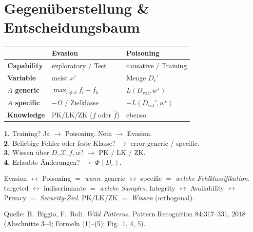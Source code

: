 \documentclass[10pt,a4paper]{article}
\begin{document}
\section{Gegen\"uberstellung \& Entscheidungsbaum}
\begin{tabularx}{\textwidth}{@{}>{\small\bfseries}l >{\small}X >{\small}X@{}}
\toprule
 & Evasion & Poisoning \\
\midrule
Capability & exploratory / Test & causative / Training \\
Variable & meist $x'$ & Menge $D_c'$ \\
$A$ generic & $\max_{l\neq k}f_l-f_k$ & $L(D_{\mathrm{val}},w^\star)$ \\
$A$ specific & $-\Omega$ / Zielklasse & $-L(D_{\mathrm{val}}',w^\star)$ \\
Knowledge & PK/LK/ZK ($f$ oder $\hat f$) & ebenso \\
\bottomrule
\end{tabularx}

\begin{tcolorbox}[tip, title=4 Fragen $\Rightarrow$ Angriff einordnen]
\textbf{1.} Training? Ja $\to$ Poisoning. Nein $\to$ Evasion.\\
\textbf{2.} Beliebige Fehler oder feste Klasse? $\to$ error-generic / specific.\\
\textbf{3.} Wissen \"uber $D,\mathcal{X},f,w$? $\to$ PK / LK / ZK.\\
\textbf{4.} Erlaubte \"Anderungen? $\to$ $\Phi(D_c)$.
\end{tcolorbox}

\begin{tcolorbox}[tip, title=Begriffspaare --- nicht vermischen]
Evasion $\leftrightarrow$ Poisoning $=$ \emph{wann}.\quad
generic $\leftrightarrow$ specific $=$ \emph{welche Fehlklassifikation}.\quad
targeted $\leftrightarrow$ indiscriminate $=$ \emph{welche Samples}.\quad
Integrity $\leftrightarrow$ Availability $\leftrightarrow$ Privacy $=$ \emph{Security-Ziel}.\quad
PK/LK/ZK $=$ \emph{Wissen} (orthogonal).
\end{tcolorbox}

\vspace{0.1em}
{\footnotesize Quelle: B.~Biggio, F.~Roli. \emph{Wild Patterns}. Pattern Recognition 84:317--331, 2018
(Abschnitte 3--4; Formeln (1)--(5); Fig.\ 1, 4, 5).}
\end{document}
